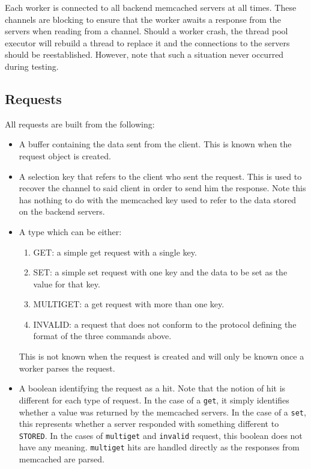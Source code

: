 \documentclass[11pt,a4paper]{article}
\begin{document}
Each worker is connected to all backend memcached servers at all times. These channels are blocking to ensure that the worker awaits a response from the servers when reading from a channel. Should a worker crash, the thread pool executor will rebuild a thread to replace it and the connections to the servers should be reestablished. However, note that such a situation never occurred during testing.

\subsection{Requests}
All requests are built from the following:
\begin{itemize}
    \item A buffer containing the data sent from the client. This is known when the request object is created.
    \item A selection key that refers to the client who sent the request. This is used to recover the channel to said client in order to send him the response. Note this has nothing to do with the memcached key used to refer to the data stored on the backend servers.
    \item A type which can be either:
    \begin{enumerate}
        \item GET: a simple get request with a single key.
        \item SET: a simple set request with one key and the data to be set as the value for that key.
        \item MULTIGET: a get request with more than one key.
        \item INVALID: a request that does not conform to the protocol defining the format of the three commands above.
    \end{enumerate}
    This is not known when the request is created and will only be known once a worker parses the request.
    \item A boolean identifying the request as a hit. Note that the notion of hit is different for each type of request. In the case of a \texttt{get}, it simply identifies whether a value was returned by the memcached servers. In the case of a \texttt{set}, this represents whether a server responded with something different to \texttt{STORED}. In the cases of \texttt{multiget} and \texttt{invalid} request, this boolean does not have any meaning. \texttt{multiget} hits are handled directly as the responses from memcached are parsed.

\end{itemize}
\end{document}
